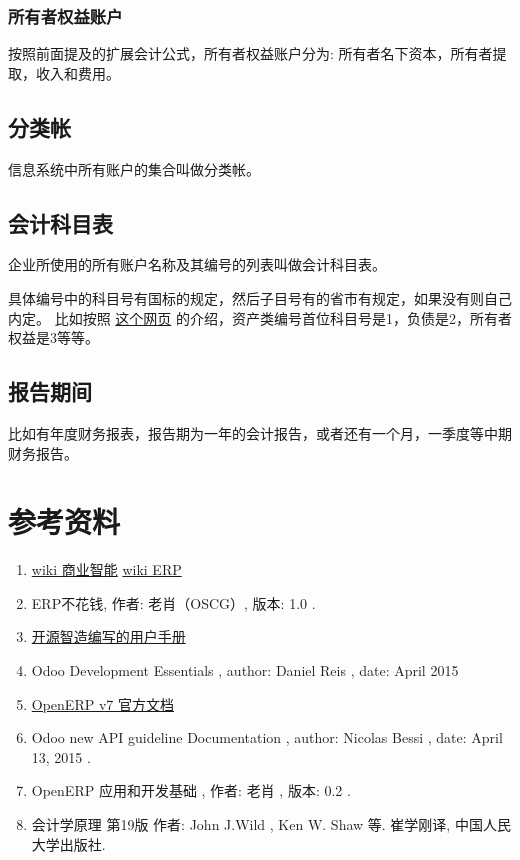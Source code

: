 \documentclass[11pt,a4paper]{sphinxmanual}
\begin{document}
\subsubsection{所有者权益账户}
\label{sec-13-11-3-3}
按照前面提及的扩展会计公式，所有者权益账户分为: 所有者名下资本，所有者提取，收入和费用。

\subsection{分类帐}
\label{sec-13-11-4}
信息系统中所有账户的集合叫做分类帐。

\subsection{会计科目表}
\label{sec-13-11-5}
企业所使用的所有账户名称及其编号的列表叫做会计科目表。

具体编号中的科目号有国标的规定，然后子目号有的省市有规定，如果没有则自己内定。 比如按照 \href{http://blog.sina.com.cn/s/blog_60dc73f50100kq6l.html}{这个网页} 的介绍，资产类编号首位科目号是1，负债是2，所有者权益是3等等。

\subsection{报告期间}
\label{sec-13-11-6}
比如有年度财务报表，报告期为一年的会计报告，或者还有一个月，一季度等中期财务报告。







\section{参考资料}
\label{sec-13-12}
\begin{enumerate}
\item \href{https://zh.wikipedia.org/wiki/\%E5\%95\%86\%E4\%B8\%9A\%E6\%99\%BA\%E8\%83\%BD}{wiki 商业智能}  \href{http://en.wikipedia.org/wiki/Enterprise_resource_planning}{wiki ERP}
\item ERP不花钱, 作者: 老肖（OSCG）, 版本:  1.0 .
\item \href{http://www.oscg.cn/openerp-manual-doc-00/}{开源智造编写的用户手册}
\item Odoo Development Essentials , author: Daniel Reis , date: April 2015
\item \href{https://doc.odoo.com/7.0/zh_CN/}{OpenERP v7 官方文档}
\item Odoo new API guideline Documentation , author: Nicolas Bessi , date: April 13, 2015 .
\item OpenERP 应用和开发基础 , 作者: 老肖 , 版本: 0.2 .
\item 会计学原理 第19版 作者: John J.Wild , Ken W. Shaw 等. 崔学刚译, 中国人民大学出版社.
\end{enumerate}
\end{document}

